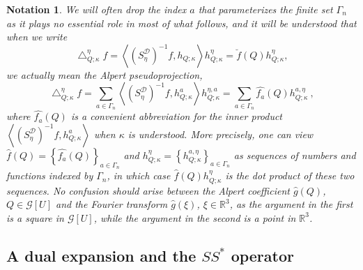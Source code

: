 \documentclass{amsart}%
\theoremstyle{plain}
\newtheorem{notation}[theorem]{Notation}
\numberwithin{equation}{section}
\begin{document}
\begin{notation}
\label{Notation Alpert} We will often drop the index $a$ that parameterizes
the finite set $\Gamma_{n}$ as it plays no essential role in most of what
follows, and it will be understood that when we write
\[
\bigtriangleup_{Q;\kappa}^{\eta}f=\left\langle \left(  S_{\eta}^{\mathcal{D}%
}\right)  ^{-1}f,h_{Q;\kappa}\right\rangle h_{Q;\kappa}^{\eta}=\breve
{f}\left(  Q\right)  h_{Q;\kappa}^{\eta},
\]
we \emph{actually} mean the Alpert \emph{pseudoprojection},%
\[
\bigtriangleup_{Q;\kappa}^{\eta}f=\sum_{a\in\Gamma_{n}}\left\langle \left(
S_{\eta}^{\mathcal{D}}\right)  ^{-1}f,h_{Q;\kappa}^{a}\right\rangle
h_{Q;\kappa}^{\eta,a}=\sum_{a\in\Gamma_{n}}\widehat{f_{a}}\left(  Q\right)
h_{Q;\kappa}^{a,\eta}\ ,
\]
where $\widehat{f_{a}}\left(  Q\right)  $ is a convenient abbreviation for the
inner product $\left\langle \left(  S_{\eta}^{\mathcal{D}}\right)
^{-1}f,h_{Q;\kappa}^{a}\right\rangle $ when $\kappa$ is understood. More
precisely, one can view $\widehat{f}\left(  Q\right)  =\left\{  \widehat
{f_{a}}\left(  Q\right)  \right\}  _{a\in\Gamma_{n}}$ and $h_{Q;\kappa}^{\eta
}=\left\{  h_{Q;\kappa}^{a,\eta}\right\}  _{a\in\Gamma_{n}}$ as sequences of
numbers and functions indexed by $\Gamma_{n}$, in which case $\widehat
{f}\left(  Q\right)  h_{Q;\kappa}^{\eta}$ is the dot product of these two
sequences. No confusion should arise between the Alpert coefficient
$\widehat{g}\left(  Q\right)  $, $Q\in\mathcal{G}\left[  U\right]  $ and the
Fourier transform $\widehat{g}\left(  \xi\right)  $, $\xi\in\mathbb{R}^{3}$,
as the argument in the first is a square in $\mathcal{G}\left[  U\right]  $,
while the argument in the second is a point in $\mathbb{R}^{3}$.
\end{notation}

\subsection{A dual expansion and the $SS^{\ast}$ operator}
\end{document}
